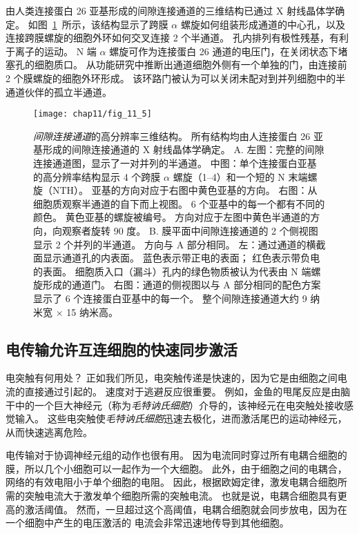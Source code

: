 由人类连接蛋白 26 亚基形成的间隙连接通道的三维结构已通过 X 射线晶体学确定。
如图~\ref{fig:11_5}~所示，该结构显示了跨膜 $\alpha$ 螺旋如何组装形成通道的中心孔，以及连接跨膜螺旋的细胞外环如何交叉连接 2 个半通道。
孔内排列有极性残基，有利于离子的运动。
N 端 $\alpha$ 螺旋可作为连接蛋白 26 通道的电压门，在关闭状态下堵塞孔的细胞质口。
从功能研究中推断出通道细胞外侧有一个单独的门，由连接前 2 个膜螺旋的细胞外环形成。
该环路门被认为可以关闭未配对到并列细胞中的半通道伙伴的孤立半通道。


\begin{figure}[htbp]
	\centering
	\texttt{[image: chap11/fig\_11\_5]}
	\caption{\textit{间隙连接通道}的高分辨率三维结构。
		所有结构均由人连接蛋白 26 亚基形成的间隙连接通道的 X 射线晶体学确定。
		A. 左图：完整的间隙连接通道图，显示了一对并列的半通道。
		中图：单个连接蛋白亚基的高分辨率结构显示 4 个跨膜 $\alpha$ 螺旋（1–4）和一个短的 N 末端螺旋（NTH）。
		亚基的方向对应于右图中黄色亚基的方向。
		右图：从细胞质观察半通道的自下而上视图。
		6 个亚基中的每一个都有不同的颜色。
		黄色亚基的螺旋被编号。
		方向对应于左图中黄色半通道的方向，向观察者旋转 90 度。
		B. 膜平面中间隙连接通道的 2 个侧视图显示 2 个并列的半通道。
		方向与 A 部分相同。
		左：通过通道的横截面显示通道孔的内表面。
		蓝色表示带正电的表面；
		红色表示带负电的表面。
		细胞质入口（漏斗）孔内的绿色物质被认为代表由 N 端螺旋形成的通道门。
		右图：通道的侧视图以与 A 部分相同的配色方案显示了 6 个连接蛋白亚基中的每一个。
		整个间隙连接通道大约 9 纳米宽 $\times$ 15 纳米高。}
	\label{fig:11_5}
\end{figure}


\subsection{电传输允许互连细胞的快速同步激活}

电突触有何用处？
正如我们所见，电突触传递是快速的，因为它是由细胞之间电流的直接通过引起的。
速度对于逃避反应很重要。
例如，金鱼的甩尾反应是由脑干中的一个巨大神经元（称为\textit{毛特讷氏细胞}）介导的，该神经元在电突触处接收感觉输入。
这些电突触使\textit{毛特讷氏细胞}迅速去极化，进而激活尾巴的运动神经元，从而快速逃离危险。


电传输对于协调神经元组的动作也很有用。
因为电流同时穿过所有电耦合细胞的膜，所以几个小细胞可以一起作为一个大细胞。
此外，由于细胞之间的电耦合，网络的有效电阻小于单个细胞的电阻。
因此，根据欧姆定律，激发电耦合细胞所需的突触电流大于激发单个细胞所需的突触电流。
也就是说，电耦合细胞具有更高的激活阈值。
然而，一旦超过这个高阈值，电耦合细胞就会同步放电，因为在一个细胞中产生的电压激活的  电流会非常迅速地传导到其他细胞。


